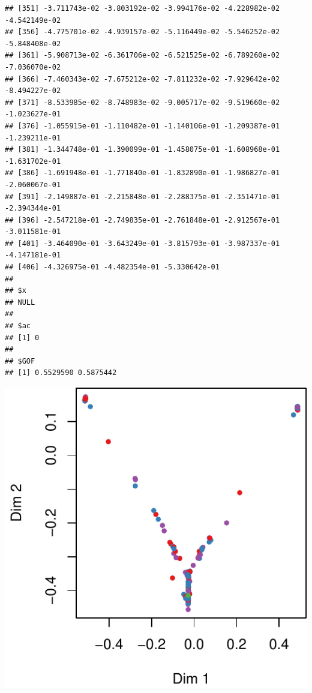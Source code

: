 \documentclass[]{article}
\newenvironment{Shaded}{\begin{snugshade}}{\end{snugshade}}
\newcommand{\DataTypeTok}[1]{\textcolor[rgb]{0.13,0.29,0.53}{#1}}
\newcommand{\DecValTok}[1]{\textcolor[rgb]{0.00,0.00,0.81}{#1}}
\newcommand{\KeywordTok}[1]{\textcolor[rgb]{0.13,0.29,0.53}{\textbf{#1}}}
\newcommand{\NormalTok}[1]{#1}
\newcommand{\OperatorTok}[1]{\textcolor[rgb]{0.81,0.36,0.00}{\textbf{#1}}}
\begin{document}
\begin{verbatim}
## [351] -3.711743e-02 -3.803192e-02 -3.994176e-02 -4.228982e-02 -4.542149e-02
## [356] -4.775701e-02 -4.939157e-02 -5.116449e-02 -5.546252e-02 -5.848408e-02
## [361] -5.908713e-02 -6.361706e-02 -6.521525e-02 -6.789260e-02 -7.036070e-02
## [366] -7.460343e-02 -7.675212e-02 -7.811232e-02 -7.929642e-02 -8.494227e-02
## [371] -8.533985e-02 -8.748983e-02 -9.005717e-02 -9.519660e-02 -1.023627e-01
## [376] -1.055915e-01 -1.110482e-01 -1.140106e-01 -1.209387e-01 -1.239211e-01
## [381] -1.344748e-01 -1.390099e-01 -1.458075e-01 -1.608968e-01 -1.631702e-01
## [386] -1.691948e-01 -1.771840e-01 -1.832890e-01 -1.986827e-01 -2.060067e-01
## [391] -2.149887e-01 -2.215848e-01 -2.288375e-01 -2.351471e-01 -2.394344e-01
## [396] -2.547218e-01 -2.749835e-01 -2.761848e-01 -2.912567e-01 -3.011581e-01
## [401] -3.464090e-01 -3.643249e-01 -3.815793e-01 -3.987337e-01 -4.147181e-01
## [406] -4.326975e-01 -4.482354e-01 -5.330642e-01
## 
## $x
## NULL
## 
## $ac
## [1] 0
## 
## $GOF
## [1] 0.5529590 0.5875442
\end{verbatim}

\begin{Shaded}
\end{Shaded}

\includegraphics{markdown_v50_files/figure-latex/unnamed-chunk-107-3.pdf}
\end{document}
